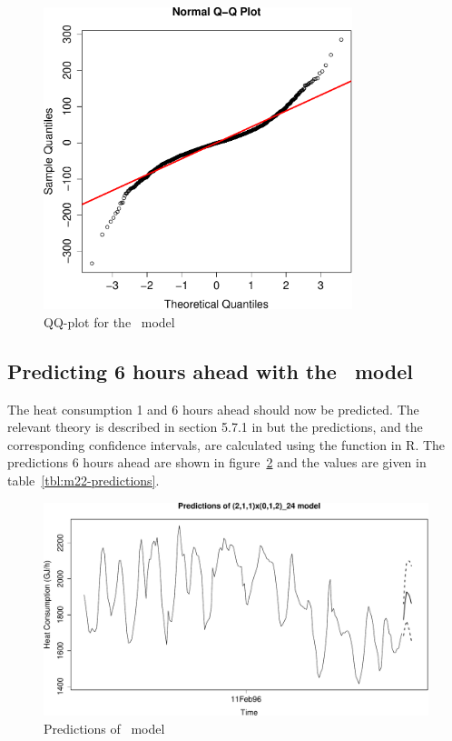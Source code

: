 \begin{figure}[!ht]
    \centering
    \includegraphics[width=90mm]{../plots/m22-qq.pdf}
    \caption{QQ-plot for the \mtwentytwo\ model}
    \label{fig:m22-qq}
\end{figure}

\subsection*{Predicting 6 hours ahead with the \mtwentytwo\ model}

The heat consumption 1 and 6 hours ahead should now be predicted. The relevant theory is described in section 5.7.1 in \cite{hm} but the predictions, and the corresponding confidence intervals, are calculated using the  function in R. The predictions 6 hours ahead are shown in figure~\ref{fig:m22-predictions} and the values are given in table~\ref{tbl:m22-predictions}.

\begin{figure}[ht]
    \centering
    \includegraphics[width=120mm]{../plots/m22-predictions.pdf}
    \caption{Predictions of \mtwentytwo\ model}
    \label{fig:m22-predictions}
\end{figure}


